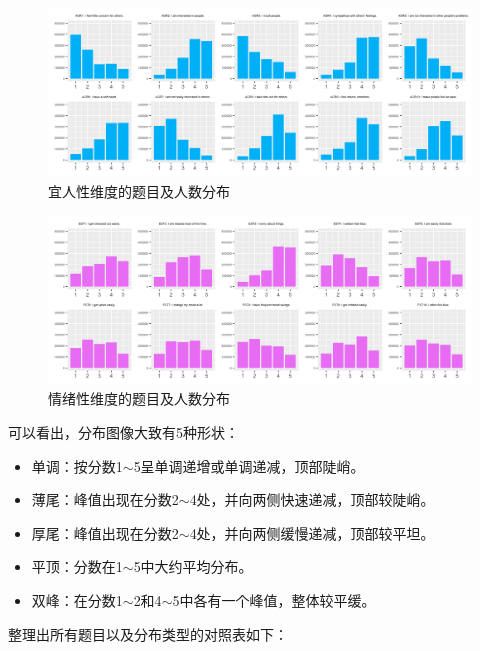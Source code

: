 \documentclass[UTF8]{ctexart}
\begin{document}
\begin{figure}[H]
  \centering
  \includegraphics[scale=0.478]{AGR.png}
  \caption{宜人性维度的题目及人数分布}
\end{figure}
\begin{figure}[H]
  \centering
  \includegraphics[scale=0.478]{EST.png}
  \caption{情绪性维度的题目及人数分布}
\end{figure}
可以看出，分布图像大致有5种形状：
\begin{itemize}
  \item 单调：按分数1$\sim$5呈单调递增或单调递减，顶部陡峭。
  \item 薄尾：峰值出现在分数2$\sim$4处，并向两侧快速递减，顶部较陡峭。
  \item 厚尾：峰值出现在分数2$\sim$4处，并向两侧缓慢递减，顶部较平坦。
  \item 平顶：分数在1$\sim$5中大约平均分布。
  \item 双峰：在分数1$\sim$2和4$\sim$5中各有一个峰值，整体较平缓。
\end{itemize}
整理出所有题目以及分布类型的对照表如下：
\end{document}
